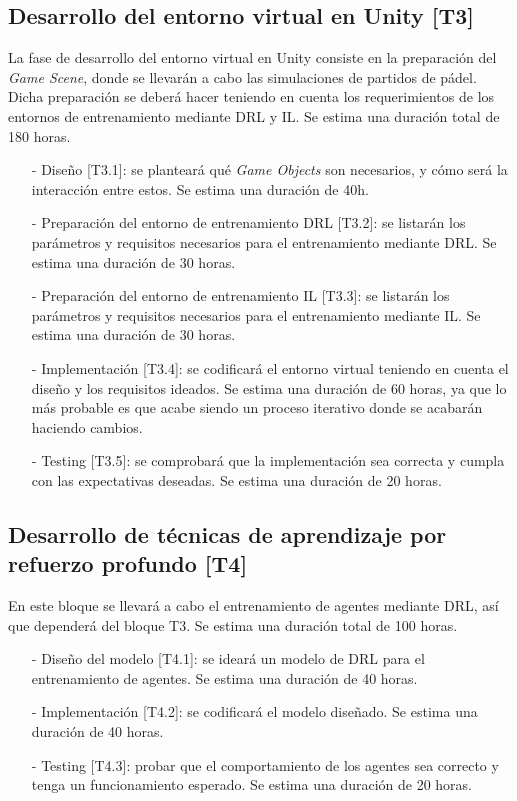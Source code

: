 \subsection{Desarrollo del entorno virtual en Unity [T3]}
La fase de desarrollo del entorno virtual en Unity consiste en la preparación del \emph{Game Scene}, donde se llevarán a cabo las simulaciones de partidos de pádel. Dicha preparación se deberá hacer teniendo en cuenta los requerimientos de los entornos de entrenamiento mediante DRL y IL. Se estima una duración total de 180 horas.

\begin{enumerate}
    \item[-] Diseño [T3.1]: se planteará qué \emph{Game Objects} son necesarios, y cómo será la interacción entre estos. Se estima una duración de 40h. %
    \item[-] Preparación del entorno de entrenamiento DRL [T3.2]: se listarán los parámetros y requisitos necesarios para el entrenamiento mediante DRL. Se estima una duración de 30 horas. %
    \item[-] Preparación del entorno de entrenamiento IL [T3.3]: se listarán los parámetros y requisitos necesarios para el entrenamiento mediante IL. Se estima una duración de 30 horas. %
    \item[-] Implementación [T3.4]: se codificará el entorno virtual teniendo en cuenta el diseño y los requisitos ideados. Se estima una duración de 60 horas, ya que lo más probable es que acabe siendo un proceso iterativo donde se acabarán haciendo cambios. %
    \item[-] Testing [T3.5]: se comprobará que la implementación sea correcta y cumpla con las expectativas deseadas. Se estima una duración de 20 horas. %
\end{enumerate}

\newpage

\subsection{Desarrollo de técnicas de aprendizaje por refuerzo profundo [T4]}
En este bloque se llevará a cabo el entrenamiento de agentes mediante DRL, así que dependerá del bloque T3. Se estima una duración total de 100 horas.
\begin{enumerate}
    \item[-] Diseño del modelo [T4.1]: se ideará un modelo de DRL para el entrenamiento de agentes. Se estima una duración de 40 horas.%
    \item[-] Implementación [T4.2]: se codificará el modelo diseñado. Se estima una duración de 40 horas. %
    \item[-] Testing [T4.3]: probar que el comportamiento de los agentes sea correcto y tenga un funcionamiento esperado. Se estima una duración de 20 horas.%
\end{enumerate}

